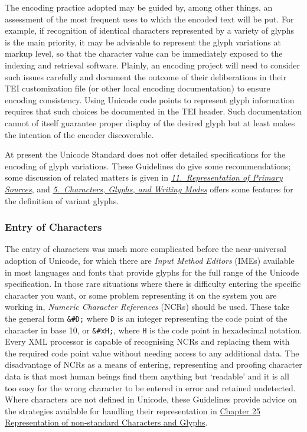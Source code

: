 The encoding practice adopted may be guided by, among other things, an assessment of the most frequent uses to which the encoded text will be put. For example, if recognition of identical characters represented by a variety of glyphs is the main priority, it may be advisable to represent the glyph variations at markup level, so that the character value can be immediately exposed to the indexing and retrieval software. Plainly, an encoding project will need to consider such issues carefully and document the outcome of their deliberations in their TEI customization file (or other local encoding documentation) to ensure encoding consistency. Using Unicode code points to represent glyph information requires that such choices be documented in the TEI header. Such documentation cannot of itself guarantee proper display of the desired glyph but at least makes the intention of the encoder discoverable.\par
At present the Unicode Standard does not offer detailed specifications for the encoding of glyph variations. These Guidelines do give some recommendations; some discussion of related matters is given in \textit{\hyperref[PH]{11.\ Representation of Primary Sources}}, and \textit{\hyperref[WD]{5.\ Characters, Glyphs, and Writing Modes}} offers some features for the definition of variant glyphs.
\subsubsection[{Entry of Characters}]{Entry of Characters}\label{D4-44}\par
The entry of characters was much more complicated before the near-universal adoption of Unicode, for which there are \textit{Input Method Editors} (IMEs) available in most languages and fonts that provide glyphs for the full range of the Unicode specification. In those rare situations where there is difficulty entering the specific character you want, or some problem representing it on the system you are working in, \textit{Numeric Character References} (NCRs) should be used. These take the general form \texttt{\&\#D;} where \texttt{D} is an integer representing the code point of the character in base 10, or \texttt{\&\#xH;}, where \texttt{H} is the code point in hexadecimal notation. Every XML processor is capable of recognising NCRs and replacing them with the required code point value without needing access to any additional data. The disadvantage of NCRs as a means of entering, representing and proofing character data is that most human beings find them anything but ‘readable’ and it is all too easy for the wrong character to be entered in error and retained undetected. Where characters are not defined in Unicode, these Guidelines provide advice on the strategies available for handling their representation in \hyperref[WD]{Chapter 25 Representation of non-standard Characters and Glyphs}.
